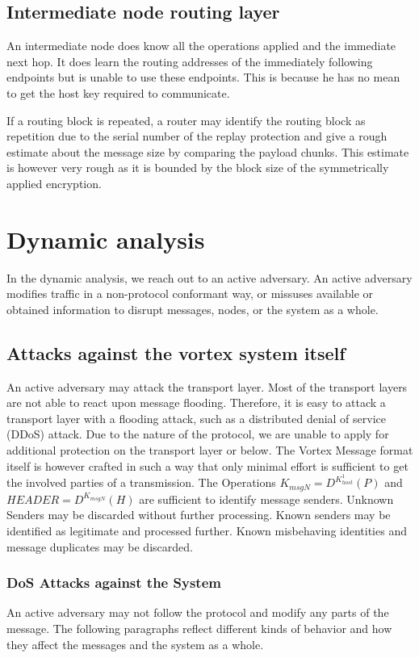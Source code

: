 \section{Intermediate node routing layer}
An intermediate node does know all the operations applied and the immediate next hop. It does learn the routing addresses of the immediately following endpoints but is unable to use these endpoints. This is because he has no mean to get the host key required to communicate.

If a routing block is repeated, a router may identify the routing block as repetition due to the serial number of the replay protection and give a rough estimate about the message size by comparing the payload chunks. This estimate is however very rough as it is bounded by the block size of the symmetrically applied encryption.

\chapter{Dynamic analysis}
In the dynamic analysis, we reach out to an active adversary. An active adversary modifies traffic in a non-protocol conformant way, or missuses available or obtained information to disrupt messages, nodes, or the system as a whole.

\section{Attacks against the vortex system itself}
An active adversary may attack the transport layer. Most of the transport layers are not able to react upon message flooding. Therefore, it is easy to attack a transport layer with a flooding attack, such as a distributed denial of service (DDoS) attack. Due to the nature of the protocol, we are unable to apply for additional protection on the transport layer or below. The Vortex Message format itself is however crafted in such a way that only minimal effort is sufficient to get the involved parties of a transmission. The Operations $ K_{msgN}=D^{K^{1}_{host}}\left(P\right)$ and $HEADER=D^{K_{msgN}}\left(H\right)$ are sufficient to identify message senders. Unknown Senders may be discarded without further processing. Known senders may be identified as legitimate and processed further. Known misbehaving identities and message duplicates may be discarded. 


\subsection{DoS Attacks against the System}
An active adversary may not follow the protocol and modify any parts of the message. The following paragraphs reflect different kinds of behavior and how they affect the messages and the system as a whole.

